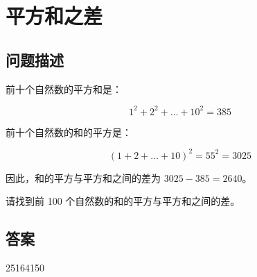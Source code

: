 \section{平方和之差}
\subsection{问题描述}
\begin{tcolorbox}
	前十个自然数的平方和是：

	\[
		1^2 + 2^2 + \dots + 10^2 = 385
	\]

	前十个自然数的和的平方是：

	\[
		(1 + 2 + \dots + 10)^2 = 55^2 = 3025
	\]

	因此，和的平方与平方和之间的差为 \( 3025 - 385 = 2640 \)。

	请找到前 100 个自然数的和的平方与平方和之间的差。
\end{tcolorbox}

\subsection{答案}
 25164150
